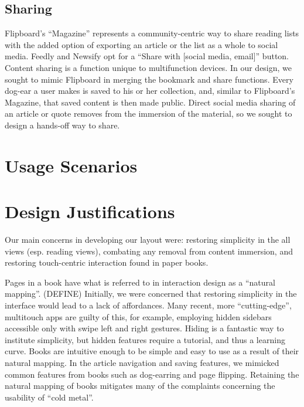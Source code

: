 \documentclass[11pt, oneside]{article}   	%
\begin{document}
\subsection{Sharing}
Flipboard's ``Magazine'' represents a community-centric way to share reading lists with the added option of exporting an article or the list as a whole to social media. Feedly and Newsify opt for a ``Share with [social media, email]'' button. Content sharing is a function unique to multifunction devices. In our design, we sought to mimic Flipboard in merging the bookmark and share functions. Every dog-ear a user makes is saved to his or her collection, and, similar to Flipboard's Magazine, that saved content is then made public. Direct social media sharing of an article or quote removes from the immersion of the material, so we sought to design a hands-off way to share.

\section{Usage Scenarios}

\section{Design Justifications}
Our main concerns in developing our layout were: restoring simplicity in the all views (esp. reading views), combating any removal from content immersion, and restoring touch-centric interaction found in paper books.

Pages in a book have what is referred to in interaction design as a ``natural mapping''. (DEFINE) Initially, we were concerned that restoring simplicity in the interface would lead to a lack of affordances. Many recent, more ``cutting-edge'', multitouch apps are guilty of this, for example, employing hidden sidebars accessible only with swipe left and right gestures. Hiding is a fantastic way to institute simplicity, but hidden features require a tutorial, and thus a learning curve. Books are intuitive enough to be simple and easy to use as a result of their natural mapping. In the article navigation and saving features, we mimicked common features from books such as dog-earring and page flipping. Retaining the natural mapping of books mitigates many of the complaints concerning the usability of ``cold metal''.
\end{document}
